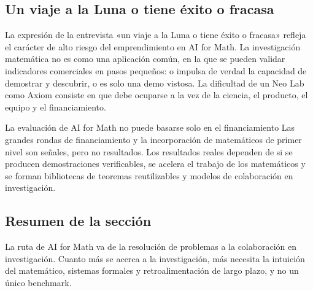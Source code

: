 \subsection{Un viaje a la Luna o tiene éxito o fracasa}

La expresión de la entrevista «un viaje a la Luna o tiene éxito o fracasa» refleja el carácter de alto riesgo del emprendimiento en AI for Math. La investigación matemática no es como una aplicación común, en la que se pueden validar indicadores comerciales en pasos pequeños: o impulsa de verdad la capacidad de demostrar y descubrir, o es solo una demo vistosa. La dificultad de un Neo Lab como Axiom consiste en que debe ocuparse a la vez de la ciencia, el producto, el equipo y el financiamiento.

\begin{warningbox}{La evaluación de AI for Math no puede basarse solo en el financiamiento}
Las grandes rondas de financiamiento y la incorporación de matemáticos de primer nivel son señales, pero no resultados. Los resultados reales dependen de si se producen demostraciones verificables, se acelera el trabajo de los matemáticos y se forman bibliotecas de teoremas reutilizables y modelos de colaboración en investigación.
\end{warningbox}

\subsection{Resumen de la sección}

La ruta de AI for Math va de la resolución de problemas a la colaboración en investigación. Cuanto más se acerca a la investigación, más necesita la intuición del matemático, sistemas formales y retroalimentación de largo plazo, y no un único benchmark.
